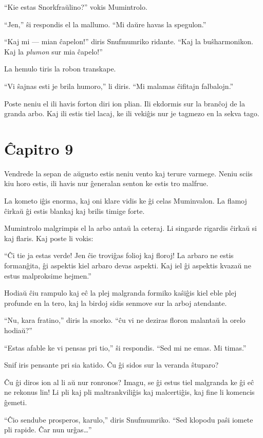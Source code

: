 ``Kie estas Snorkfraŭlino?'' vokis Mumintrolo.

``Jen,'' ŝi respondis el la mallumo. ``Mi daŭre havas la spegulon.''

``Kaj mi --- mian ĉapelon!'' diris Snufmumriko ridante. ``Kaj la buŝharmonikon. Kaj la \emph{plumon} sur mia ĉapelo!''

La hemulo tiris la robon transkape.

``Vi ŝajnas esti je brila humoro,'' li diris. ``Mi malamas ĉifitajn falbalojn.''

Poste neniu el ili havis forton diri ion plian. Ili ekdormis sur la branĉoj de la granda arbo. Kaj ili estis tiel lacaj, ke ili vekiĝis nur je tagmezo en la sekva tago.

\chapter[Ĉapitro 9]{Ĉapitro 9}

Vendrede la sepan de aŭgusto estis neniu vento kaj terure varmege. Neniu sciis kiu horo estis, ili havis nur ĝeneralan senton ke estis tro malfrue.

La kometo iĝis enorma, kaj oni klare vidis ke ĝi celas Muminvalon. La flamoj ĉirkaŭ ĝi estis blankaj kaj brilis timige forte.

Mumintrolo malgrimpis el la arbo antaŭ la ceteraj. Li singarde rigardis ĉirkaŭ si kaj flaris. Kaj poste li vokis:

``Ĉi tie ja estas verde! Jen ĉie troviĝas folioj kaj floroj! La arbaro ne estis formanĝita, ĝi aspektis kiel arbaro devas aspekti. Kaj iel ĝi aspektis kvazaŭ ne estus malproksime hejmen.''

Hodiaŭ ĉiu rampulo kaj eĉ la plej malgranda formiko kaŝiĝis kiel eble plej profunde en la tero, kaj la birdoj sidis senmove sur la arboj atendante.

``Nu, kara fratino,'' diris la snorko. ``ĉu vi ne deziras floron malantaŭ la orelo hodiaŭ?''

``Estas afable ke vi pensas pri tio,'' ŝi respondis. ``Sed mi ne emas. Mi timas.''

Snif iris pensante pri sia katido. Ĉu ĝi sidos sur la veranda ŝtuparo?

Ĉu ĝi diros ion al li aŭ nur ronronos? Imagu, se ĝi estus tiel malgranda ke ĝi eĉ ne rekonus lin! Li pli kaj pli maltrankviliĝis kaj malcertiĝis, kaj fine li komencis ĝemeti.

``Ĉio sendube prosperos, karulo,'' diris Snufmumriko. ``Sed klopodu paŝi iomete pli rapide. Ĉar nun urĝas{\ldots}''

